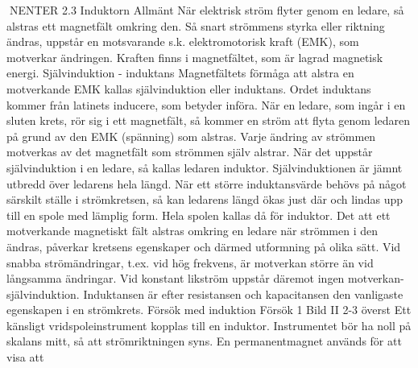 \documentclass[a4paper,twoside,twocolumn,openright]{book}
\begin{document}
{{NENTER
2.3 Induktorn
Allmänt
När elektrisk ström flyter genom en ledare,
så alstras ett magnetfält omkring den. Så
snart strömmens styrka eller riktning ändras,
uppstår en motsvarande s.k. elektromotorisk kraft (EMK), som motverkar ändringen.
Kraften finns i magnetfältet, som är lagrad
magnetisk energi.
Självinduktion - induktans
Magnetfältets förmåga att alstra en motverkande EMK kallas självinduktion eller induktans. Ordet induktans kommer från latinets
inducere, som betyder införa.
När en ledare, som ingår i en sluten krets,
rör sig i ett magnetfält, så kommer en ström
att flyta genom ledaren på grund av den
EMK (spänning) som alstras. Varje ändring
av strömmen motverkas av det magnetfält
som strömmen själv alstrar.
När det uppstår självinduktion i en ledare,
så kallas ledaren induktor. Självinduktionen
är jämnt utbredd över ledarens hela längd.
När ett större induktansvärde behövs på
något särskilt ställe i strömkretsen, så kan
ledarens längd ökas just där och lindas upp
till en spole med lämplig form. Hela spolen
kallas då för induktor.
Det att ett motverkande magnetiskt fält
alstras omkring en ledare när strömmen i
den ändras, påverkar kretsens egenskaper
och därmed utformning på olika sätt. Vid
snabba strömändringar, t.ex. vid hög frekvens, är motverkan större än vid långsamma
ändringar. Vid konstant likström uppstår
däremot ingen motverkan- självinduktion.
Induktansen är efter resistansen och
kapacitansen den vanligaste egenskapen i
en strömkrets.
Försök med induktion
Försök 1
Bild II 2-3 överst
Ett känsligt vridspoleinstrument kopplas till
en induktor. Instrumentet bör ha noll på
skalans mitt, så att strömriktningen syns. En
permanentmagnet används för att visa att

}}
\end{document}
